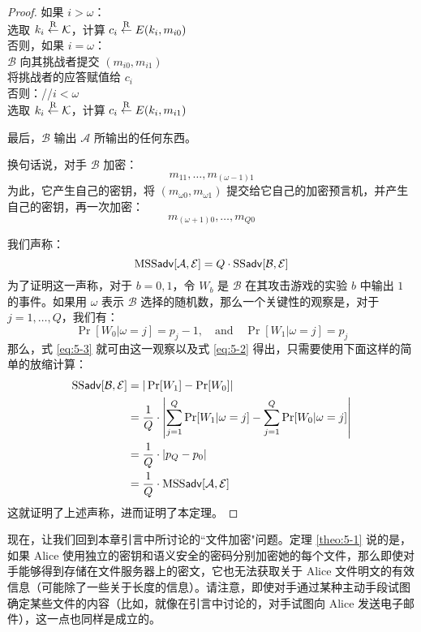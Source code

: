 \begin{proof}
\hspace*{25pt} 如果 $i>\omega$：\\
\hspace*{75pt} 选取 $k_i\overset{\rm R}\leftarrow\mathcal{K}$，计算 $c_i\overset{\rm R}\leftarrow E(k_i,m_{i0})$\\
\hspace*{50pt} 否则，如果 $i=\omega$：\\
\hspace*{75pt} $\mathcal{B}$ 向其挑战者提交 $(m_{i0},m_{i1})$\\
\hspace*{75pt} 将挑战者的应答赋值给 $c_i$\\
\hspace*{50pt} 否则：\quad//\quad$i<\omega$\\
\hspace*{75pt} 选取 $k_i\overset{\rm R}\leftarrow\mathcal{K}$，计算 $c_i\overset{\rm R}\leftarrow E(k_i,m_{i1})$

\vspace{5pt}

\hspace*{5pt} 最后，$\mathcal{B}$ 输出 $\mathcal{A}$ 所输出的任何东西。

\vspace{5pt}

\noindent
换句话说，对手 $\mathcal{B}$ 加密：
\[
m_{11},\dots,m_{(\omega-1)1}
\]
为此，它产生自己的密钥，将 $(m_{\omega0},m_{\omega1})$ 提交给它自己的加密预言机，并产生自己的密钥，再一次加密：
\[
m_{(\omega+1)0},\dots,m_{Q0}
\]

我们声称：
\begin{equation}\label{eq:5-3}
{\rm MSS}\mathsf{adv}[\mathcal{A},\mathcal{E}]=Q\cdot{\rm SS\mathsf{adv}}[\mathcal{B},\mathcal{E}]
\end{equation}
为了证明这一声称，对于 $b=0,1$，令 $W_b$ 是 $\mathcal{B}$ 在其攻击游戏的实验 $b$ 中输出 $1$ 的事件。如果用 $\omega$ 表示 $\mathcal{B}$ 选择的随机数，那么一个关键性的观察是，对于 $j=1,\dots,Q$，我们有：
\[
\Pr[W_0|\omega=j]=p_j-1,
\quad\text{and}\quad
\Pr[W_1|\omega=j]=p_j
\]
那么，式 \ref{eq:5-3} 就可由这一观察以及式 \ref{eq:5-2} 得出，只需要使用下面这样的简单的放缩计算：
\[
\begin{aligned}
{\rm SS\mathsf{adv}}[\mathcal{B},\mathcal{E}]
&=|\Pr[W_1]-\Pr[W_0]|\\
&=\frac{1}{Q}\cdot\left\lvert\sum_{j=1}^Q\Pr[W_1|\omega=j]-\sum_{j=1}^Q\Pr[W_0|\omega=j]\right\rvert\\
&=\frac{1}{Q}\cdot|p_Q-p_0|\\
&=\frac{1}{Q}\cdot{\rm MSS}\mathsf{adv}[\mathcal{A},\mathcal{E}]
\end{aligned}
\]
这就证明了上述声称，进而证明了本定理。
\end{proof}

现在，让我们回到本章引言中所讨论的``文件加密"问题。定理 \ref{theo:5-1} 说的是，如果 Alice 使用独立的密钥和语义安全的密码分别加密她的每个文件，那么即使对手能够得到存储在文件服务器上的密文，它也无法获取关于 Alice 文件明文的有效信息（可能除了一些关于长度的信息）。请注意，即使对手通过某种主动手段试图确定某些文件的内容（比如，就像在引言中讨论的，对手试图向 Alice 发送电子邮件），这一点也同样是成立的。